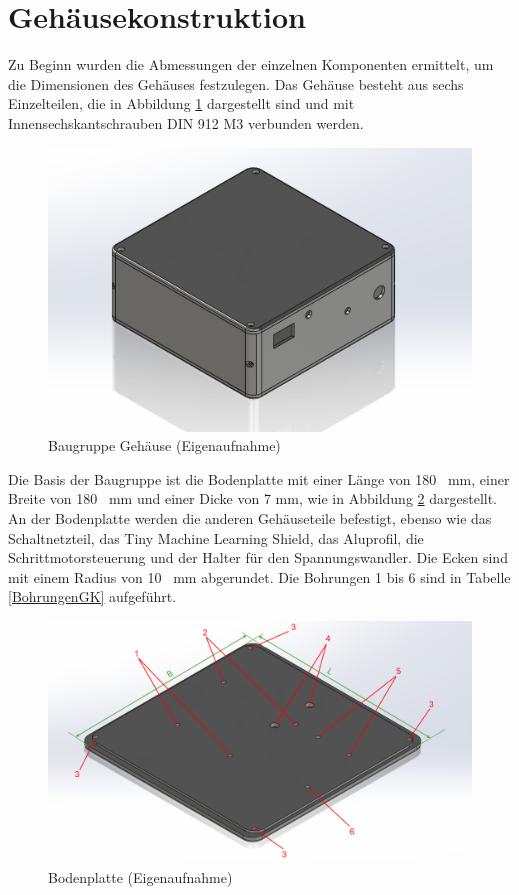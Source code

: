 \section{Gehäusekonstruktion}
Zu Beginn wurden die Abmessungen der einzelnen Komponenten ermittelt, um die Dimensionen des Gehäuses festzulegen. Das Gehäuse besteht aus sechs Einzelteilen, die in Abbildung \ref{GehK} dargestellt sind und mit Innensechskantschrauben DIN 912 M3 verbunden werden.
\begin{figure}[H]	
 	\begin{center}
		\includegraphics[width=\textwidth]{Images/Konstruktion/GehaeuseK.png}
		\caption{Baugruppe Gehäuse (Eigenaufnahme)} \label{GehK}
	\end{center}
\end{figure}

Die Basis der Baugruppe ist die Bodenplatte mit einer Länge von 180 \ mm, einer Breite von 180 \ mm und einer Dicke von 7 mm, wie in Abbildung \ref{BodenK} dargestellt. An der Bodenplatte werden die anderen Gehäuseteile befestigt, ebenso wie das Schaltnetzteil, das Tiny Machine Learning Shield, das Aluprofil, die Schrittmotorsteuerung und der Halter für den Spannungswandler. Die Ecken sind mit einem Radius von 10 \ mm abgerundet. Die Bohrungen 1 bis 6 sind in Tabelle \ref{BohrungenGK} aufgeführt.

\begin{figure}[H]
	\begin{center}
		\includegraphics[width=\textwidth]{Images/Konstruktion/BodenK.png}
		\caption{Bodenplatte (Eigenaufnahme)} \label{BodenK}
	\end{center}
\end{figure}


